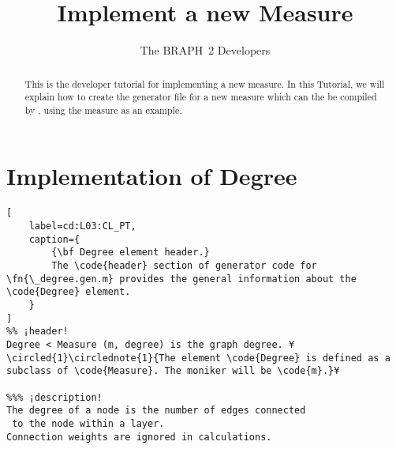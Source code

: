 \documentclass{tufte-handout}
\title{Implement a new Measure}
\author[The BRAPH~2 Developers]{The BRAPH~2 Developers}
\begin{document}
\maketitle

\begin{abstract}
\noindent
This is the developer tutorial for implementing a new measure. 
In this Tutorial, we will explain how to create the generator file  for a new measure which can the be compiled by , using the measure  as an example.
\end{abstract}

\section{Implementation of Degree}

\begin{lstlisting}[
	label=cd:L03:CL_PT,
	caption={
		{\bf Degree element header.}
		The \code{header} section of generator code for \fn{\_degree.gen.m} provides the general information about the \code{Degree} element.
	}
]
%% ¡header!
Degree < Measure (m, degree) is the graph degree. ¥\circled{1}\circlednote{1}{The element \code{Degree} is defined as a subclass of \code{Measure}. The moniker will be \code{m}.}¥

%%% ¡description!
The degree of a node is the number of edges connected 
 to the node within a layer. 
Connection weights are ignored in calculations.
\end{lstlisting}
\end{document}
